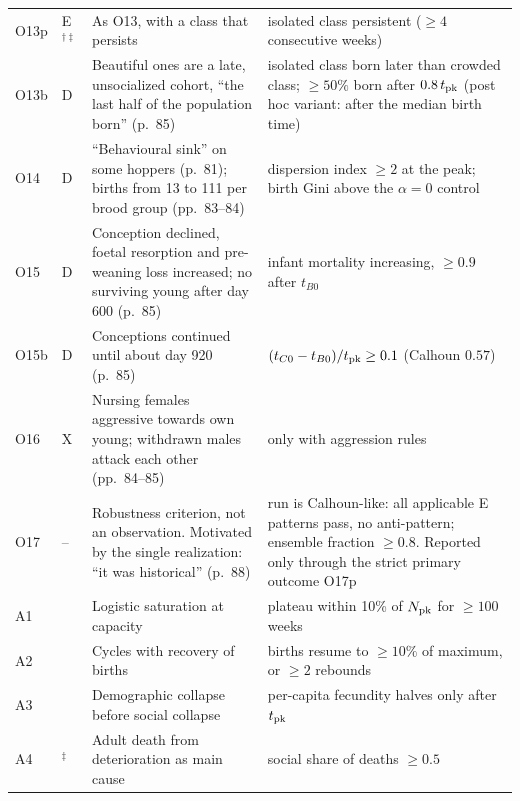 {\begin{longtable}{@{}p{}p{}p{}p{}@{}}
O13p & E$^{\dagger\ddagger}$ & As O13, with a class that persists & isolated class persistent ($\ge4$ consecutive weeks) \\
O13b & D & Beautiful ones are a late, unsocialized cohort, ``the last half of the population born'' (p.~85) & isolated class born later than crowded class; $\ge 50\%$ born after $0.8\,t_{\rm pk}$ (post hoc variant: after the median birth time) \\
O14 & D & ``Behavioural sink'' on some hoppers (p.~81); births from 13 to 111 per brood group (pp.~83--84) & dispersion index $\ge 2$ at the peak; birth Gini above the $\alpha=0$ control \\
O15 & D & Conception declined, foetal resorption and pre-weaning loss increased; no surviving young after day 600 (p.~85) & infant mortality increasing, $\ge 0.9$ after $t_{B0}$ \\
O15b & D & Conceptions continued until about day 920 (p.~85) & $(t_{C0}-t_{B0})/t_{\rm pk}\ge 0.1$ (Calhoun $0.57$) \\
O16 & X & Nursing females aggressive towards own young; withdrawn males attack each other (pp.~84--85) & only with aggression rules \\
O17 & -- & Robustness criterion, not an observation. Motivated by the single realization: ``it was historical'' (p.~88) & run is Calhoun-like: all applicable E patterns pass, no anti-pattern; ensemble fraction $\ge 0.8$. Reported only through the strict primary outcome O17p \\
\midrule
A1 & & Logistic saturation at capacity & plateau within 10\% of $N_{\rm pk}$ for $\ge 100$ weeks \\
A2 & & Cycles with recovery of births & births resume to $\ge 10\%$ of maximum, or $\ge 2$ rebounds \\
A3 & & Demographic collapse before social collapse & per-capita fecundity halves only after $t_{\rm pk}$ \\
A4 & $^\ddagger$ & Adult death from deterioration as main cause & social share of deaths $\ge 0.5$ \\
\end{longtable}
}

